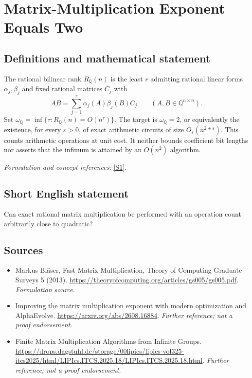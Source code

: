 \documentclass[11pt]{article}
\begin{document}
\section*{\texorpdfstring{Matrix-Multiplication Exponent Equals Two}{Matrix-Multiplication Exponent Equals Two}}\label{26}
\subsection{Definitions and mathematical statement}
The rational bilinear rank $R_{{\mathbb{Q}}}(n)$ is the least $r$ admitting rational linear forms $\alpha_j,\beta_j$ and fixed rational matrices $C_j$ with
\[
 AB=\sum_{j=1}^r\alpha_j(A)\beta_j(B)C_j\qquad(A,B\in{\mathbb{Q}}^{n\times n}).
\]
Set $\omega_{{\mathbb{Q}}}=\inf\{\tau:R_{{\mathbb{Q}}}(n)=O(n^\tau)\}$. The target is $\omega_{{\mathbb{Q}}}=2$, or equivalently the existence, for every $\varepsilon>0$, of exact arithmetic circuits of size $O_\varepsilon(n^{2+\varepsilon})$. This counts arithmetic operations at unit cost. It neither bounds coefficient bit lengths nor asserts that the infimum is attained by an $O(n^2)$ algorithm.
\par\smallskip\textit{Formulation and concept references:} \href{https://theoryofcomputing.org/articles/gs005/gs005.pdf}{[S1]}.

\subsection{Short English statement}
Can exact rational matrix multiplication be performed with an operation count arbitrarily close to quadratic?
\subsection{Sources}
\begin{itemize}
\item[S1]Markus Bläser, Fast Matrix Multiplication, Theory of Computing Graduate Surveys 5 (2013).
\url{https://theoryofcomputing.org/articles/gs005/gs005.pdf}.
\textit{Formulation source.}
\item[S2]Improving the matrix multiplication exponent with modern optimization and AlphaEvolve.
\url{https://arxiv.org/abs/2608.16884}.
\textit{Further reference; not a proof endorsement.}
\item[S3]Finite Matrix Multiplication Algorithms from Infinite Groups.
\url{https://drops.dagstuhl.de/storage/00lipics/lipics-vol325-itcs2025/html/LIPIcs.ITCS.2025.18/LIPIcs.ITCS.2025.18.html}.
\textit{Further reference; not a proof endorsement.}
\end{itemize}
\end{document}
